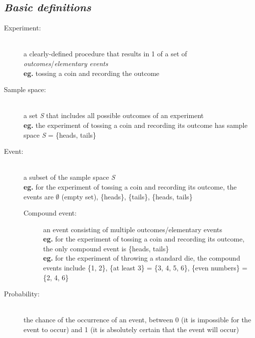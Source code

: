 \documentclass{article}
\begin{document}
\subsection{\em Basic definitions}
\begin{description}
\item[\sc Experiment:] \hfill\\
a clearly-defined procedure that results in 1 of a set of \textit{outcomes}/\textit{elementary events}\\
\textbf{eg.} tossing a coin and recording the outcome
\item[\sc Sample space:] \hfill\\
a set \textsl{S} that includes all possible outcomes of an experiment\\
\textbf{eg.} the experiment of tossing a coin and recording its outcome has sample space \textsl{S} = \{heads, tails\}
\item[\sc Event:] \hfill\\
a subset of the sample space \textsl{S}\\
\textbf{eg.} for the experiment of tossing a coin and recording its outcome, the events are $\emptyset$ (empty set), \{heads\}, \{tails\}, \{heads, tails\}
	\begin{description}
	\item[\sc Compound event:] an event consisting of multiple outcomes/elementary events\\
	\textbf{eg.} for the experiment of tossing a coin and recording its outcome, the only compound event is \{heads, tails\}\\[1ex]
	\textbf{eg.} for the experiment of throwing a standard die, the compound events include \{1, 2\}, \{at least 3\} = \{3, 4, 5, 6\}, \{even numbers\} = \{2, 4, 6\}
	\end{description}
\item[\sc Probability:]\hfill\\
the chance of the occurrence of an event, between 0 (it is impossible for the event to occur) and 1 (it is absolutely certain that the event will occur)
\end{description}
\end{document}
